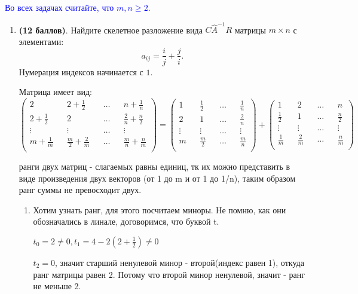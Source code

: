 \documentclass[a4paper, 11pt]{article}
\newcommand{\prob}[1]{\item \textbf{(#1 баллов)}.}
\begin{document}
\textcolor{blue}{Во всех задачах считайте, что $m,n\geq 2$.}
\begin{enumerate}
	\prob{12} Найдите скелетное разложение вида $C\widehat A^{-1} R$ матрицы $m\times n$  с элементами: \[a_{ij} = \frac{i}{j} + \frac{j}{i}.\] Нумерация индексов начинается с $1$.

		Матрица имеет вид: $\begin{pmatrix}
			2 && 2 + \frac{1}{2} && \dots && n + \frac{1}{n} \\
			2 + \frac{1}{2} && 2 && \dots && \frac{2}{n} + \frac{n}{2} \\
			\vdots && \vdots && \dots && \vdots \\
			m + \frac{1}{m} && \frac{m}{2} + \frac{2}{m} && \dots && \frac{m}{n} + \frac{n}{m} \\
		\end{pmatrix} = \begin{pmatrix}
		1 && \frac{1}{2} && \dots && \frac{1}{n} \\ 
		2 && 1 && \dots && \frac{2}{n} \\
		\vdots && \vdots && \dots && \vdots \\
		m && \frac{m}{2} && \dots && \frac{m}{n} \\
	\end{pmatrix} + \begin{pmatrix}
		1 && 2 && \dots && n \\
		\frac{1}{2} && 1 && \dots && \frac{n}{2} \\
		\vdots && \vdots && \dots && \vdots \\
		\frac{1}{m} && \frac{2}{m} && \dots && \frac{n}{m} \\
		\end{pmatrix}$
	
	 ранги двух матриц - слагаемых равны единиц, тк их можно представить в виде произведения двух векторов (от 1 до m и от 1 до 1/n), таким образом ранг суммы не превосходит двух.
	 
	 

		\begin{enumerate}
			\item 	Хотим узнать ранг, для этого посчитаем миноры. Не помню, как они обозначались в линале, договоримся, что буквой t.

			$t_0 = 2 \neq 0, t_1 = 4 - 2(2 + \frac{1}{2}) \neq 0$

			$t_2 = 0$, значит старший ненулевой минор - второй(индекс равен 1), откуда ранг матрицы равен 2. Потому что второй минор ненулевой, значит - ранг не меньше 2.


\end{enumerate}
\end{enumerate}
\end{document}
